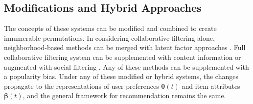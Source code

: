 \documentclass[sigconf]{acmart}
\begin{document}
\subsection{Modifications and Hybrid Approaches}
\label{sec:hybrid}

The concepts of these systems can be modified and combined to create innumerable permutations.  In considering collaborative filtering alone, neighborhood-based methods can be merged with latent factor approaches \cite{Koren:2008}.  Full collaborative filtering system can be supplemented with content information \cite{CTR} or augmented with social filtering \cite{Chaney:2015}.  Any of these methods can be supplemented with a popularity bias.  Under any of these modified or hybrid systems, the changes  propagate to the representations of user preferences $\boldsymbol{\theta}(t)$ and item attributes $\boldsymbol{\beta}(t)$, and the general framework for recommendation remains the same.



\end{document}
